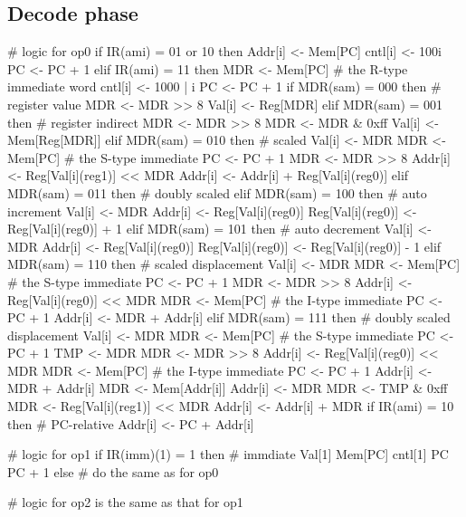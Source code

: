 \documentclass[12pt]{article}
\begin{document}
\subsection{Decode phase}
\begin{verbatimtab}
# logic for op0
if IR(ami) = 01 or 10 then
	Addr[i] <- Mem[PC]
	cntl[i] <- 100i
	PC <- PC + 1
elif IR(ami) = 11 then
	MDR <- Mem[PC] # the R-type immediate word
	cntl[i] <- 1000 | i
	PC <- PC + 1
	if MDR(sam) = 000 then # register value
		MDR <- MDR >> 8
		Val[i] <- Reg[MDR]
	elif MDR(sam) = 001 then # register indirect
		MDR <- MDR >> 8
		MDR <- MDR & 0xff
		Val[i] <- Mem[Reg[MDR]]
	elif MDR(sam) = 010 then # scaled
		Val[i] <- MDR
		MDR <- Mem[PC] # the S-type immediate
		PC <- PC + 1
		MDR <- MDR >> 8
		Addr[i] <- Reg[Val[i](reg1)] << MDR
		Addr[i] <- Addr[i] + Reg[Val[i](reg0)]
	elif MDR(sam) = 011 then # doubly scaled
	elif MDR(sam) = 100 then # auto increment
		Val[i] <- MDR
		Addr[i] <- Reg[Val[i](reg0)]
		Reg[Val[i](reg0)] <- Reg[Val[i](reg0)] + 1
	elif MDR(sam) = 101 then # auto decrement
		Val[i] <- MDR
		Addr[i] <- Reg[Val[i](reg0)]
		Reg[Val[i](reg0)] <- Reg[Val[i](reg0)] - 1
	elif MDR(sam) = 110 then # scaled displacement
		Val[i] <- MDR
		MDR <- Mem[PC] # the S-type immediate
		PC <- PC + 1
		MDR <- MDR >> 8
		Addr[i] <- Reg[Val[i](reg0)] << MDR
		MDR <- Mem[PC] # the I-type immediate
		PC <- PC + 1
		Addr[i] <- MDR + Addr[i]
	elif MDR(sam) = 111 then # doubly scaled displacement
		Val[i] <- MDR
		MDR <- Mem[PC] # the S-type immediate
		PC <- PC + 1
		TMP <- MDR
		MDR <- MDR >> 8
		Addr[i] <- Reg[Val[i](reg0)] << MDR
		MDR <- Mem[PC] # the I-type immediate
		PC <- PC + 1
		Addr[i] <- MDR + Addr[i]
		MDR <- Mem[Addr[i]]
		Addr[i] <- MDR
		MDR <- TMP & 0xff
		MDR <- Reg[Val[i](reg1)] << MDR
		Addr[i] <- Addr[i] + MDR
if IR(ami) = 10 then # PC-relative
	Addr[i] <- PC + Addr[i]

# logic for op1
if IR(imm)(1) = 1 then # immdiate
	Val[1] \get Mem[PC]
	cntl[1] 
	PC \get PC + 1
else
	# do the same as for op0

# logic for op2 is the same as that for op1
\end{verbatimtab}
\end{document}
